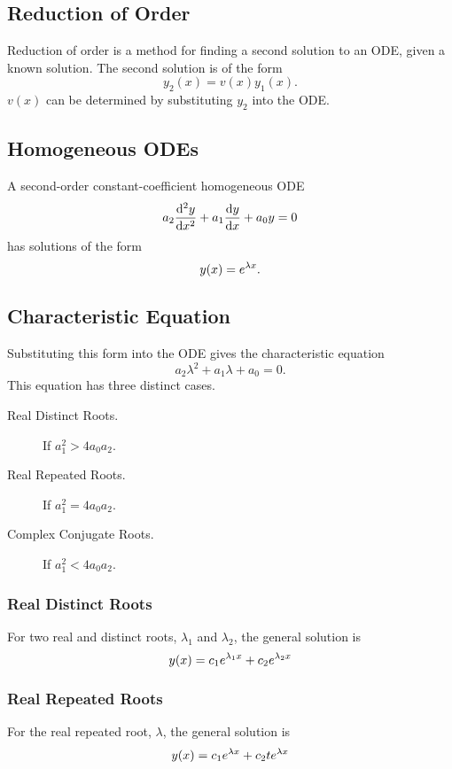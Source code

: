 \documentclass{article}
\begin{document}
\subsection{Reduction of Order}
Reduction of order is a method for finding a second solution
to an ODE, given a known solution.
The second solution is of the form
\begin{equation*}
    y_2(x) = v\left(x\right) y_1(x).
\end{equation*}
\(v(x)\) can be determined by substituting \(y_2\) into the ODE\@.
\subsection{Homogeneous ODEs}
A second-order constant-coefficient homogeneous ODE
\begin{equation*}
    a_2\dv[2]{y}{x} + a_1\dv{y}{x} + a_0y = 0
\end{equation*}
has solutions of the form
\begin{equation*}
    y(x) = e^{\lambda x}.
\end{equation*}
\subsection{Characteristic Equation}
Substituting this form into the ODE gives the characteristic equation
\begin{equation*}
    a_2\lambda^2 + a_1\lambda + a_0 = 0.
\end{equation*}
This equation has three distinct cases.
\begin{description}
    \item[Real Distinct Roots.] If \(a_1^2 > 4a_0a_2\).
    \item[Real Repeated Roots.] If \(a_1^2 = 4a_0a_2\).
    \item[Complex Conjugate Roots.] If \(a_1^2 < 4a_0a_2\).
\end{description}
\subsubsection{Real Distinct Roots}
For two real and distinct roots, \(\lambda_1\) and \(\lambda_2\), the general solution is
\begin{equation*}
    y(x) = c_1e^{\lambda_1 x} + c_2e^{\lambda_2 x}
\end{equation*}
\subsubsection{Real Repeated Roots}
For the real repeated root, \(\lambda\), the general solution is
\begin{equation*}
    y(x) = c_1e^{\lambda x} + c_2 te^{\lambda x}
\end{equation*}
\end{document}
